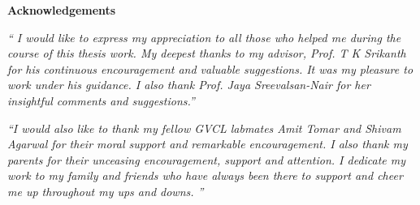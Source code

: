 \begin{center}
\textbf{\large Acknowledgements}
\end{center}

\vspace{1cm}

\emph{`` I would like to express my appreciation to all those who helped me during the course of this thesis work. My deepest thanks to my advisor, Prof. T K Srikanth for his continuous encouragement and valuable suggestions.  It was my pleasure to work under his guidance. I also thank Prof. Jaya Sreevalsan-Nair for her insightful comments and suggestions.''}  

\vspace{1cm}

\emph{``I would also like to thank my fellow GVCL labmates Amit Tomar and Shivam Agarwal for their moral support and remarkable encouragement. I also thank my parents for their unceasing encouragement, support and attention. I dedicate my work to my family and friends who have always been there to support and cheer me up throughout my ups and downs. ''}

\hfill 
